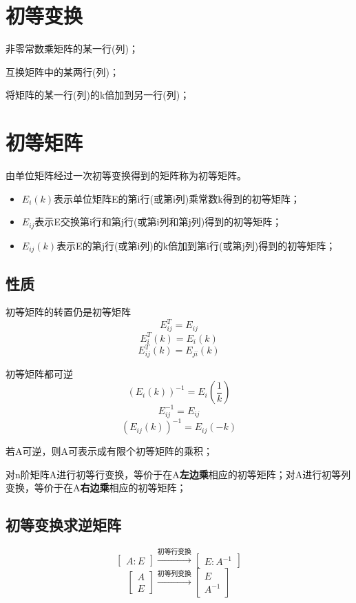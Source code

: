 \section{初等变换}

非零常数乘矩阵的某一行(列)；

互换矩阵中的某两行(列)；

将矩阵的某一行(列)的k倍加到另一行(列)；


\section{初等矩阵}
由单位矩阵经过一次初等变换得到的矩阵称为初等矩阵。
\begin{itemize}
    \item \(E_i(k)\)表示单位矩阵E的第i行(或第i列)乘常数k得到的初等矩阵；
    \item \(E_{ij}\)表示E交换第i行和第j行(或第i列和第j列)得到的初等矩阵；
    \item \(E_{ij}(k)\)表示E的第j行(或第i列)的k倍加到第i行(或第j列)得到的初等矩阵；
\end{itemize}


\subsection{性质}

初等矩阵的转置仍是初等矩阵
\[E_{ij}^T = E_{ij}\]
\[E_i^T(k) = E_i(k)\]
\[E_{ij}^T(k) = E_{ji}(k)\]

初等矩阵都可逆
\[(E_i(k))^{-1} = E_i(\frac{1}{k})\]
\[E_{ij}^{-1} = E_{ij}\]
\[(E_{ij}(k))^{-1} = E_{ij}(-k)\]

若A可逆，则A可表示成有限个初等矩阵的乘积；

对n阶矩阵A进行初等行变换，等价于在A\textbf{左边乘}相应的初等矩阵；对A进行初等列变换，等价于在A\textbf{右边乘}相应的初等矩阵；


\subsection{初等变换求逆矩阵}
\[
\begin{bmatrix}
A:E
\end{bmatrix}
\xrightarrow{\text{初等行变换}}
\begin{bmatrix}
E:A^{-1}
\end{bmatrix}
\]
\[
\begin{bmatrix}
A \\ 
E
\end{bmatrix}
\xrightarrow{\text{初等列变换}}
\begin{bmatrix}
E \\ 
A^{-1}
\end{bmatrix}
\]

